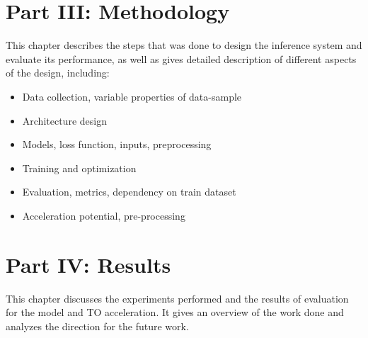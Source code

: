 
\section*{Part III: Methodology}

  \vspace{1mm}

\noindent  This chapter describes the steps that was done to design the inference system and evaluate its performance, as well as gives detailed description of different aspects of the design, including: 
	\begin{itemize}
		\item Data collection, variable properties of data-sample
		\item Architecture design
		\item Models, loss function, inputs, preprocessing
		\item Training and optimization
		\item Evaluation, metrics, dependency on train dataset
		\item Acceleration potential, pre-processing
	\end{itemize}

\section*{Part IV: Results}

  \vspace{1mm}

\noindent This chapter discusses the experiments performed and the results of evaluation for the model and TO acceleration.
It gives an overview of the work done and analyzes the direction for the future work.


